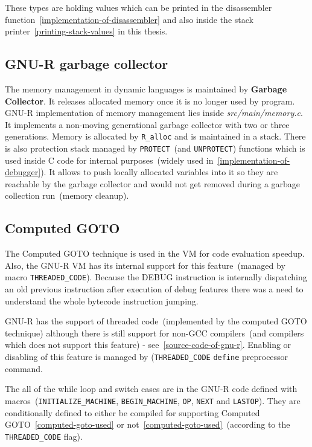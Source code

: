 \documentclass[thesis=M,english]{FITthesis}[2018/10/20]
\newcommand{\code}[1]{\texttt{#1}}
\begin{document}
These types are holding values which can be printed in the disassembler function~\ref{implementation-of-disassembler} and also inside the stack printer~\ref{printing-stack-values} in this thesis.

\subsection{GNU-R garbage collector}\label{GC}

The memory management in dynamic languages is maintained by  \textbf{Garbage Collector}. It releases allocated memory once it is no longer used by program. GNU-R implementation of memory management lies inside \textit{src/main/memory.c}. It implements a non-moving generational garbage collector with two or three generations. Memory is allocated by \code{R{\_}alloc} and is maintained in a stack. There is also protection stack managed by \code{PROTECT}~(and \code{UNPROTECT}) functions which is used inside C code for internal purposes~(widely used in~\ref{implementation-of-debugger}). It allows to push locally allocated variables into it so they are reachable by the garbage collector and would not get removed during a garbage collection run~(memory cleanup).

\subsection{Computed GOTO}\label{Computed-GOTO}

The Computed GOTO technique is used in the VM for code evaluation speedup. Also, the GNU-R VM has its internal support for this feature~(managed by macro \code{THREADED{\_}CODE}). Because the DEBUG instruction is internally dispatching an old previous instruction after execution of debug features there was a need to understand the whole bytecode instruction jumping. 

GNU-R has the support of threaded code~(implemented by the computed GOTO technique) although there is still support for non-GCC compilers~(and compilers which does not support this feature) - see~\ref{source-code-of-gnu-r}. Enabling or disabling of this feature is managed by (\code{THREADED{\_}CODE} \code{define} preprocessor command. 

The all of the while loop and switch cases are in the GNU-R code defined with macros~(\code{INITIALIZE{\_}MACHINE}, \code{BEGIN{\_}MACHINE}, \code{OP}, \code{NEXT} and \code{LASTOP}). They are conditionally defined to either be compiled for supporting Computed GOTO~\ref{computed-goto-used} or not~\ref{computed-goto-used}~(according to the \code{THREADED{\_}CODE} flag).
\end{document}
